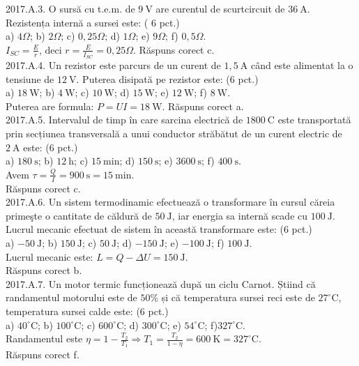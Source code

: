2017.A.3. O sursă cu t.e.m. de $9 \mathrm{~V}$ are curentul de scurtcircuit de $36 \mathrm{~A}$. Rezistența internă a sursei este: ( 6 pct.)\\ a) $4 \Omega$; b) $2 \Omega$; c) $0,25 \Omega$; d) $1 \Omega$; e) $9 \Omega$; f) $0,5 \Omega$.\\ $I_{S C}=\frac{E}{r}$, deci $r=\frac{E}{I_{S C}}=0,25 \Omega$. Răspuns corect c.\\

2017.A.4. Un rezistor este parcurs de un curent de $1,5 \mathrm{~A}$ când este alimentat la o tensiune de $12 \mathrm{~V}$. Puterea disipată pe rezistor este: (6 pct.)\\ a) $18 \mathrm{~W}$; b) $4 \mathrm{~W}$; c) $10 \mathrm{~W}$; d) $15 \mathrm{~W}$; e) $12 \mathrm{~W}$; f) $8 \mathrm{~W}$.\\ Puterea are formula: $P=U I=18 \mathrm{~W}$. Răspuns corect a.\\

2017.A.5. Intervalul de timp în care sarcina electrică de $1800 \mathrm{~C}$ este transportată prin secțiunea transversală a unui conductor străbătut de un curent electric de $2 \mathrm{~A}$ este: (6 pct.)\\ a) $180 \mathrm{~s}$; b) $12 \mathrm{~h}$; c) $15 \mathrm{~min}$; d) $150 \mathrm{~s}$; e) $3600 \mathrm{~s}$; f) $400 \mathrm{~s}$.\\ Avem $\tau=\frac{Q}{I}=900 \mathrm{~s}=15 \mathrm{~min}$.\\ Răspuns corect c.\\

2017.A.6. Un sistem termodinamic efectuează o transformare în cursul căreia primeşte o cantitate de căldură de $50 \mathrm{~J}$, iar energia sa internă scade cu $100 \mathrm{~J}$. Lucrul mecanic efectuat de sistem în această transformare este: (6 pct.)\\ a) $-50 \mathrm{~J}$; b) $150 \mathrm{~J}$; c) $50 \mathrm{~J}$; d) $-150 \mathrm{~J}$; e) $-100 \mathrm{~J}$; f) $100 \mathrm{~J}$.\\ Lucrul mecanic este: $L=Q-\Delta U=150 \mathrm{~J}$.\\ Răspuns corect b.\\

2017.A.7. Un motor termic funcționează după un ciclu Carnot. Știind că randamentul motorului este de $50 \%$ și că temperatura sursei reci este de $27^{\circ} \mathrm{C}$, temperatura sursei calde este: (6 pct.)\\ a) $40^{\circ} \mathrm{C}$; b) $100^{\circ} \mathrm{C}$; c) $600^{\circ} \mathrm{C}$; d) $300^{\circ} \mathrm{C}$; e) $54^{\circ} \mathrm{C}$; f)$327^{\circ} \mathrm{C}$.\\ Randamentul este $\eta=1-\frac{T_{2}}{T_{1}} \Rightarrow T_{1}=\frac{T_{2}}{1-\eta}=600 \mathrm{~K}=327^{\circ} \mathrm{C}$.\\ Răspuns corect f.\\

